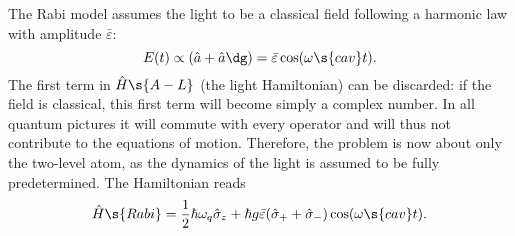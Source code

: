 \documentclass[fontsize=9pt,bookmarkpackage=false]{scrartcl}
\renewcommand{\hbar}{\hslash}
\begin{document}
The Rabi model assumes the light to be a classical field following a harmonic law with amplitude $\bar \varepsilon$:
\begin{equation}
   E(t) \propto ( \hat a + \hat a\dg ) = \bar \varepsilon \cos ( \omega\s{cav} t  ).
\end{equation}
The first term in $\hat H\s{A-L}$ (the light Hamiltonian) can be discarded: if the field is classical, this first term will become simply a complex number.
In all quantum pictures it will commute with every operator and will thus not contribute to the equations of motion.
Therefore, the problem is now about only the two-level atom, as the dynamics of the light is assumed to be fully predetermined.
The Hamiltonian reads
\begin{equation}
  \hat H\s{Rabi}
  = \frac{ 1 }{ 2 } \hbar \omega_q \hat \sigma_z
  + \hbar g \bar \varepsilon ( \hat \sigma_+ + \hat \sigma_- ) \cos ( \omega\s{cav} t ).
\end{equation}
\end{document}
